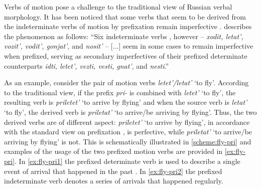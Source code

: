 Verbs of motion pose a challenge to the traditional view of Russian verbal morphology. It has been noticed that some verbs that seem to be derived from the indeterminate verbs  of motion by prefixation  remain imperfective   . \citet{Titelbaum:90} describes the phenomenon as follows:
``Six indeterminate verbs , however -- \textit{xodit, letat', vozit', vodit', gonjat',} and \textit{nosit'} -- [...] seem in some cases to remain imperfective    when prefixed, serving as secondary imperfectives  of their prefixed determinate counterparts \textit{idti, letet', vezti, vesti, gnat'}, and \textit{nesti}.'' 


As an example, consider the pair of motion verbs \textit{letet'/letat'} `to fly'. According to the traditional view, if the prefix \textit{pri-}   is combined with \textit{letet'}\textsubscript{\DET} `to fly', the resulting verb is \textit{priletet'}\textsuperscript{\PF} `to arrive by flying' and when the source verb is \textit{letat'}\textsubscript{\INDET} `to fly', the derived verb is \textit{priletat'}\textsuperscript{\IPF} `to arrive/be arriving by flying'. Thus, the two derived verbs are of different aspect: \textit{priletet'} `to arrive by flying', in accordance with the standard view on prefixation , is perfective, while \textit{priletat'} `to arrive/be arriving by flying' is not. This is schematically illustrated in \ref{scheme:fly-pri} and examples of the usage of the two prefixed motion verbs are provided in \ref{ex:fly-pri}. In \ref{ex:fly-pri1} the prefixed determinate verb  is used to describe a single event of arrival that happened in the past . In \ref{ex:fly-pri2} the prefixed indeterminate verb  denotes a series of arrivals that happened regularly.

